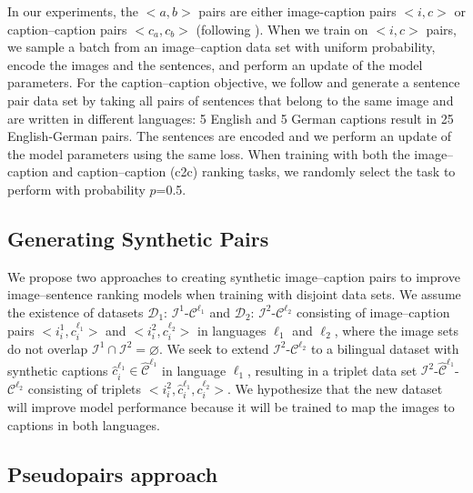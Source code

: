 In our experiments, the $<a, b>$ pairs are either image-caption pairs 
$<i, c>$ or caption--caption pairs $<c_a, c_b>$ (following \cite{D17-1303,kadar2018conll}).
When we train on $<i, c>$ pairs, we sample a batch
from an image--caption data set with uniform probability, encode the images and the sentences, and perform an update of the model parameters.
For the caption--caption objective, 
we follow \citet{kadar2018conll} and 
generate a sentence pair data set
by taking all pairs of sentences 
that belong to the same image
and are written in different languages: 5 English
and 5 German captions result in 25 English-German 
pairs. 
The sentences are encoded and we perform an update of 
the model parameters using the same loss. 
When training with both the image--caption and 
caption--caption (c2c) ranking tasks, 
we randomly select the task to perform with 
probability $p$=0.5. 

\subsection{Generating Synthetic Pairs}\label{sec:method:synthetic}

We propose two approaches to creating synthetic image--caption pairs to improve image--sentence ranking models when training with disjoint data sets. We assume the existence of datasets 
$\mathcal{D}_1$: $\mathcal{I}^1$-$\mathcal{C}^{\ell_1}$ and
$\mathcal{D}_2$: $\mathcal{I}^2$-$\mathcal{C}^{\ell_2}$
consisting of image--caption pairs $<i^1_i, c^{\ell_1}_i>$ and 
$<i^2_i, c^{\ell_2}_i>$ in 
languages $\ell_1$ and $\ell_2$, where the image sets do not overlap 
$\mathcal{I}^1 \cap \mathcal{I}^2 = \varnothing$. 
We seek to extend $\mathcal{I}^2$-$\mathcal{C}^{\ell_2}$ 
to a bilingual dataset with synthetic captions
$\hat{c}^{\ell_1}_i \in \hat{\mathcal{C}}^{\ell_1}$ 
in language $\ell_1$, resulting in a triplet data set 
$\mathcal{I}^2$-$\hat{\mathcal{C}}^{\ell_1}$-$\mathcal{C}^{\ell_2}$ 
consisting of triplets
 $<i^2_i, \hat{c}^{\ell_1}_i, c^{\ell_2}_i>$.
 We hypothesize that the new dataset will improve model performance because it will be trained to map the images to captions in both languages.%
 

\subsection{Pseudopairs approach}\label{sec:method:pseudo}

